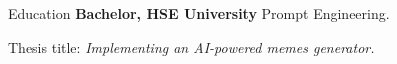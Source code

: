 \begin{rubric}{Education}
\entry*[2024 -- 2028]%
	\textbf{Bachelor, HSE University} Prompt Engineering.
	\par Thesis title: \emph{Implementing an AI-powered memes generator.}
%
\end{rubric}